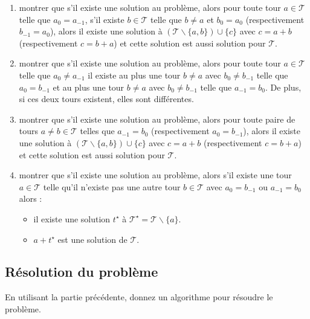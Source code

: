 \documentclass
[12pt]
{article}
\begin{document}
\begin{enumerate}
    \item montrer que s'il existe une solution au problème, alors pour toute tour $a \in \mathcal{T}$ telle que $a_0 = a_{-1}$, s'il existe $b \in \mathcal{T}$ telle que $b \neq a$ et $b_0 = a_0$  (respectivement $b_{-1} = a_0$), alors il existe une solution à $(\mathcal{T} \backslash \{a, b\}) \cup \{ c \}$ avec $c = a + b$ (respectivement $c=b+a$) et cette solution est aussi solution pour $\mathcal{T}$.
    \item montrer que s'il existe une solution au problème, alors pour toute tour $a \in \mathcal{T}$ telle que $a_0 \neq a_{-1}$ il existe au plus une tour $b \neq a$ avec $b_0 \neq b_{-1}$ telle que $a_0 = b_{-1}$ et au plus une tour $b \neq a$ avec $b_0 \neq b_{-1}$ telle que $a_{-1} = b_0$. De plus, si ces deux tours existent, elles sont différentes.
    \item montrer que s'il existe une solution au problème, alors pour toute paire de tours $a \neq b \in \mathcal{T}$ telles que $a_{-1} = b_0$ (respectivement $a_0 = b_{-1}$), alors il existe une solution à $(\mathcal{T} \backslash \{a, b\}) \cup \{ c \}$ avec $c = a + b$ (respectivement $c=b+a$)  et cette solution est aussi solution pour $\mathcal{T}$.
    \item montrer que s'il existe une solution au problème, alors s'il existe une tour $a \in \mathcal{T}$ telle qu'il n'existe pas une autre tour $b \in \mathcal{T}$ avec $a_0 = b_{-1}$ ou $a_{-1} = b_0$ alors :
    \begin{itemize}
        \item il existe une solution $t^\star$ à $\mathcal{T}^\star = \mathcal{T} \backslash \{ a \}$.
        \item $a + t^\star$ est une solution de $\mathcal{T}$.
    \end{itemize}
    \end{enumerate}

\subsection{Résolution du problème}

En utilisant la partie précédente, donnez un algorithme pour résoudre le problème.
\end{document}

